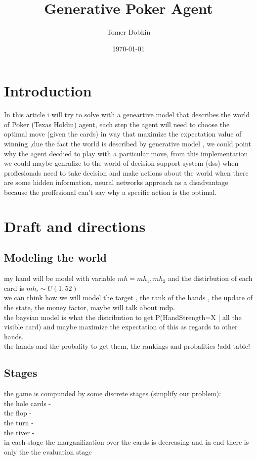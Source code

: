 \documentclass{article}
\title{Generative Poker Agent}
\author{Tomer Dobkin}
\date{\today}
\begin{document}
\maketitle
\section{Introduction}
 In this article i will try to solve with a geneartive model that describes the world of Poker (Texas Holdm)  agent, each step the agent will need to choose the optimal move (given the cards) in way that maximize the expectation value of winning  ,due the fact the world is described by generative model , we could point why the agent decdied to play with a particular move, from this implementation we could maybe genralize to the world of decision support system (dss) when proffesionals need to take decision and make actions about the world when there are some hidden information, neural networks approach as a disadvantage because the proffesional can't say why a specific action is the optimal.
\section{Draft and directions}
\subsection{Modeling the world}
my hand will be model with variable $mh={mh_1 , mh_2}$ and the distirbution of each card is $mh_i \sim U(1,52)$\\
we can think how we will model the target , the rank of the hands , the update of the state, the money factor, maybe will talk about mdp.\\
the baysian model is what the distribution to get P(HandStrength=X | all the visible card) and maybe maximize the expectation of this as regards to other hands.\\
the hands and the probality to get them, the rankings and probalities !add table!

\subsection{Stages}
the game is compunded by some discrete stages (simplify our problem):\\
the hole cards - \\
the flop - \\
the turn - \\
the river - \\
in each stage the marganilization over the cards is decreasing and in end there is only the the evaluation stage
\end{document}
